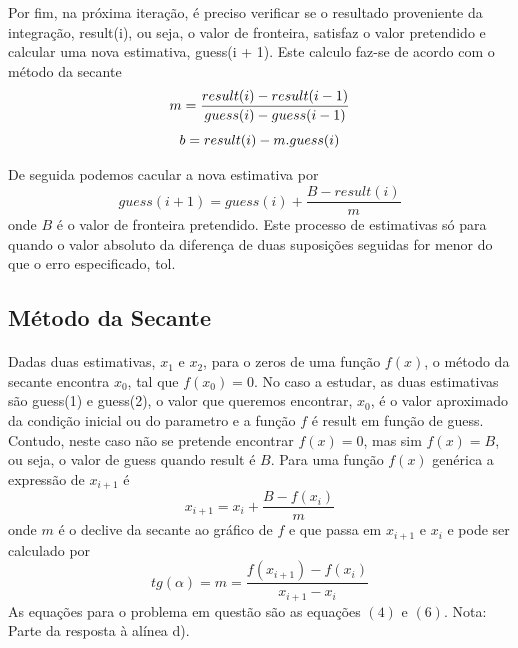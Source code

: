 \documentclass[a4paper, 11pt]{article}
\newcommand{\guessi}{{\fontfamily{pcr}\selectfont guess(i)}}
\newcommand{\guessii}{{\fontfamily{pcr}\selectfont guess(i + 1)}}
\newcommand{\resi}{{\fontfamily{pcr}\selectfont result(i)}}
\begin{document}
	Por fim, na próxima iteração, é preciso verificar se o resultado proveniente da integração, \resi, ou seja, o valor de fronteira, satisfaz o valor pretendido e calcular uma nova estimativa, \guessii. Este calculo faz-se de acordo com o método da secante
	\begin{equation}
		m = \frac{\resi - result(i - 1)}{\guessi - guess(i - 1)}
	\end{equation}
	\begin{equation}
		b = \resi - m . \guessi
	\end{equation}
	
	De seguida podemos cacular a nova estimativa por
	\begin{equation}
		guess(i + 1) = guess(i) + \frac{B - result(i)}{m}
	\end{equation}
	onde $B$ é o valor de fronteira pretendido. Este processo de estimativas só para quando o valor absoluto da diferença de duas suposições seguidas for menor do que o erro especificado, {\selectfont tol}.
	
	\subsection{Método da Secante}
	\paragraph{}
	Dadas duas estimativas, $x_{1}$ e $x_{2}$, para o zeros de uma função $f(x)$, o método da secante encontra $x_{0}$, tal que $f(x_{0})=0$. No caso a estudar, as duas estimativas são {\selectfont guess(1)} e {\selectfont guess(2)}, o valor que queremos encontrar, $x_{0}$, é o valor aproximado da condição inicial ou do parametro e a função $f$ é {\selectfont result} em função de {\selectfont guess}. Contudo, neste caso não se pretende encontrar $f(x)=0$, mas sim $f(x)=B$, ou seja, o valor de {\selectfont guess} quando {\selectfont result} é $B$. Para uma função $f(x)$ genérica a expressão de $x_{i+1}$ é
	\begin{equation}
		x_{i+1} = x_{i} + \frac{B-f(x_{i})}{m}
	\end{equation}
	onde $m$ é o declive da secante ao gráfico de $f$ e que passa em $x_{i+1}$ e $x_{i}$ e pode ser calculado por
	\begin{equation}
		tg(\alpha)=m=\frac{f(x_{i+1})-f(x_{i})}{x_{i+1}-x_{i}}
	\end{equation}
	As equações para o problema em questão são as equações $(4)$ e $(6)$.
	\newline
	{\footnotesize Nota: Parte da resposta à alínea d).}
	\newpage
	
\end{document}
